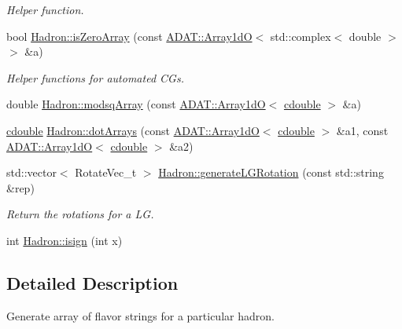 \begin{DoxyCompactItemize}
\begin{DoxyCompactList}\small\item\em Helper function. \end{DoxyCompactList}\item 
bool \mbox{\hyperlink{namespaceHadron_a4c6b00854fd4dc574c56c8ddfd1a253f}{Hadron\+::is\+Zero\+Array}} (const \mbox{\hyperlink{classADAT_1_1Array1dO}{A\+D\+A\+T\+::\+Array1dO}}$<$ std\+::complex$<$ double $>$ $>$ \&a)
\begin{DoxyCompactList}\small\item\em Helper functions for automated C\+Gs. \end{DoxyCompactList}\item 
double \mbox{\hyperlink{namespaceHadron_a05c9899cc82acc7112a4df5dab534ee4}{Hadron\+::modsq\+Array}} (const \mbox{\hyperlink{classADAT_1_1Array1dO}{A\+D\+A\+T\+::\+Array1dO}}$<$ \mbox{\hyperlink{adat-devel_2main_2irreputils_2cgs__table_8cc_a5f9966666d076841002cd443622b7ccd}{cdouble}} $>$ \&a)
\item 
\mbox{\hyperlink{adat-devel_2main_2irreputils_2cgs__table_8cc_a5f9966666d076841002cd443622b7ccd}{cdouble}} \mbox{\hyperlink{namespaceHadron_aad081d14cd95160e164751fe86cff3af}{Hadron\+::dot\+Arrays}} (const \mbox{\hyperlink{classADAT_1_1Array1dO}{A\+D\+A\+T\+::\+Array1dO}}$<$ \mbox{\hyperlink{adat-devel_2main_2irreputils_2cgs__table_8cc_a5f9966666d076841002cd443622b7ccd}{cdouble}} $>$ \&a1, const \mbox{\hyperlink{classADAT_1_1Array1dO}{A\+D\+A\+T\+::\+Array1dO}}$<$ \mbox{\hyperlink{adat-devel_2main_2irreputils_2cgs__table_8cc_a5f9966666d076841002cd443622b7ccd}{cdouble}} $>$ \&a2)
\item 
std\+::vector$<$ Rotate\+Vec\+\_\+t $>$ \mbox{\hyperlink{namespaceHadron_a4467e73143184e2935f0f0f0e31079bc}{Hadron\+::generate\+L\+G\+Rotation}} (const std\+::string \&rep)
\begin{DoxyCompactList}\small\item\em Return the rotations for a LG. \end{DoxyCompactList}\item 
int \mbox{\hyperlink{namespaceHadron_ab7c3962155ebb71e6377424d11c29daa}{Hadron\+::isign}} (int x)
\end{DoxyCompactItemize}


\subsection{Detailed Description}
Generate array of flavor strings for a particular hadron. 

